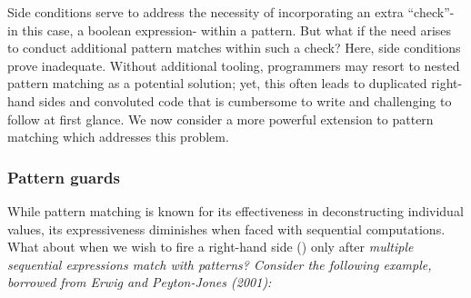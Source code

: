 \documentclass[manuscript,screen,review, 12pt]{acmart}
\begin{document}
    Side conditions serve to address the necessity of incorporating an extra
    “check”- in this case, a boolean expression- within a pattern. But what if
    the need arises to conduct additional pattern matches within such a check?
    Here, side conditions prove inadequate. Without additional tooling,
    programmers may resort to nested pattern matching as a potential solution;
    yet, this often leads to duplicated right-hand sides and convoluted code
    that is cumbersome to write and challenging to follow at first glance. We
    now consider a more powerful extension to pattern matching which addresses
    this problem. 

 \subsubsection{Pattern guards}
\label{guards}


    



            While pattern matching is known for its effectiveness in
            deconstructing individual values, its expressiveness diminishes when
            faced with sequential computations. What about when we wish to fire
            a right-hand side () only after \it{multiple
            sequential expressions} match with patterns? Consider the following
            example, borrowed from Erwig and Peyton-Jones (2001): 
\end{document}
